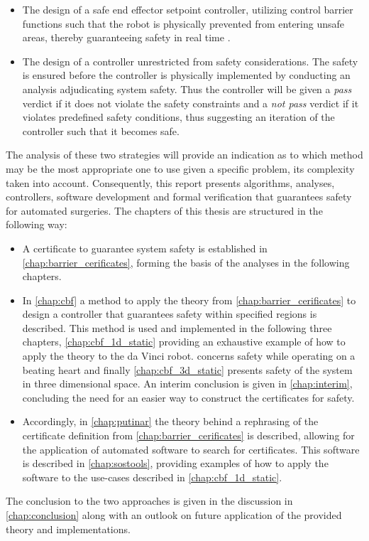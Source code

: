 \vspace{-2mm}
\begin{itemize}
\item The design of a safe end effector setpoint controller, utilizing control barrier functions such that the robot is physically prevented from entering unsafe areas, thereby guaranteeing safety in real time \citep{bib:safety}. 
\item The design of a controller unrestricted from safety considerations. The safety is ensured before the controller is physically implemented by conducting an analysis adjudicating system safety. Thus the controller will be given a \textit{pass} verdict if it does not violate the safety constraints and a \textit{not pass} verdict if it violates predefined safety conditions, thus suggesting an iteration of the controller such that it becomes safe. 
\end{itemize}
The analysis of these two strategies will provide an indication as to which method may be the most appropriate one to use given a specific problem, its complexity taken into account. Consequently, this report presents algorithms, analyses, controllers, software development and formal verification that guarantees safety for automated surgeries.
The chapters of this thesis are structured in the following way:
\begin{itemize}
\item A certificate to guarantee system safety is established in \autoref{chap:barrier_cerificates}, forming the basis of the analyses in the following chapters.

\item In \autoref{chap:cbf} a method to apply the theory from \autoref{chap:barrier_cerificates} to design a controller that guarantees safety within specified regions is described. This method is used and implemented in the following three chapters, \autoref{chap:cbf_1d_static} providing an exhaustive example of how to apply the theory to the da Vinci robot.  concerns safety while operating on a beating heart and finally \autoref{chap:cbf_3d_static}  presents safety of the system in three dimensional space. An interim conclusion is given in \autoref{chap:interim}, concluding the need for an easier way to construct the certificates for safety.

\item  Accordingly, in \autoref{chap:putinar} the theory behind a rephrasing of the certificate definition from \autoref{chap:barrier_cerificates} is described, allowing for the application of automated software to search for certificates. This software is described  in \autoref{chap:sostools}, providing examples of how to apply the software to the use-cases described in \autoref{chap:cbf_1d_static}.
\end{itemize}
The conclusion to the two approaches is given in the discussion in \autoref{chap:conclusion} along with an outlook on future application of the provided theory and implementations.



